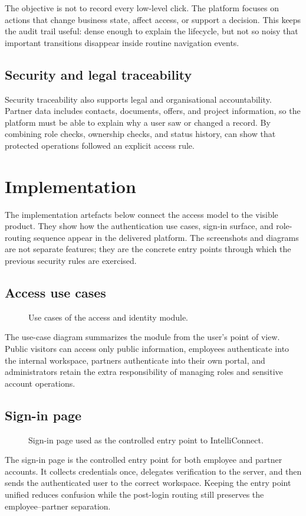 The objective is not to record every low-level click. The platform focuses on actions that change business state, affect access, or support a decision. This keeps the audit trail useful: dense enough to explain the lifecycle, but not so noisy that important transitions disappear inside routine navigation events.
\subsection{Security and legal traceability}
Security traceability also supports legal and organisational accountability. Partner data includes contacts, documents, offers, and project information, so the platform must be able to explain why a user saw or changed a record. By combining role checks, ownership checks, and status history, \projectname{} can show that protected operations followed an explicit access rule.
\section{Implementation}
The implementation artefacts below connect the access model to the visible product. They show how the authentication use cases, sign-in surface, and role-routing sequence appear in the delivered platform. The screenshots and diagrams are not separate features; they are the concrete entry points through which the previous security rules are exercised.
\subsection{Access use cases}
\begin{figure}[htbp]
  \centering
  \caption{Use cases of the access and identity module.}
\end{figure}
The use-case diagram summarizes the module from the user's point of view. Public visitors can access only public information, employees authenticate into the internal workspace, partners authenticate into their own portal, and administrators retain the extra responsibility of managing roles and sensitive account operations.
\subsection{Sign-in page}
\begin{figure}[htbp]
  \centering
  \caption{Sign-in page used as the controlled entry point to IntelliConnect.}
\end{figure}
The sign-in page is the controlled entry point for both employee and partner accounts. It collects credentials once, delegates verification to the server, and then sends the authenticated user to the correct workspace. Keeping the entry point unified reduces confusion while the post-login routing still preserves the employee--partner separation.
